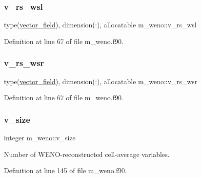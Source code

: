 \mbox{\label{namespacem__weno_a93ac8fcccd75977762710ff8c97e00cd}} 
\subsubsection{\texorpdfstring{v\+\_\+rs\+\_\+wsl}{v\_rs\_wsl}}
{\footnotesize\ttfamily type(\hyperlink{structm__derived__types_1_1vector__field}{vector\+\_\+field}), dimension(\+:), allocatable m\+\_\+weno\+::v\+\_\+rs\+\_\+wsl}



Definition at line 67 of file m\+\_\+weno.\+f90.

\mbox{\label{namespacem__weno_acf9ad1f7c2c83efea07eecbdef783431}} 
\subsubsection{\texorpdfstring{v\+\_\+rs\+\_\+wsr}{v\_rs\_wsr}}
{\footnotesize\ttfamily type(\hyperlink{structm__derived__types_1_1vector__field}{vector\+\_\+field}), dimension(\+:), allocatable m\+\_\+weno\+::v\+\_\+rs\+\_\+wsr}



Definition at line 67 of file m\+\_\+weno.\+f90.

\mbox{\label{namespacem__weno_a91b7a29671368f77d62ab0d3fd9ecff0}} 
\subsubsection{\texorpdfstring{v\+\_\+size}{v\_size}}
{\footnotesize\ttfamily integer m\+\_\+weno\+::v\+\_\+size}



Number of W\+E\+N\+O-\/reconstructed cell-\/average variables. 



Definition at line 145 of file m\+\_\+weno.\+f90.

\mbox{\label{namespacem__weno_a4f4ba6cc4536855c0302a88c05b8618e}} 
